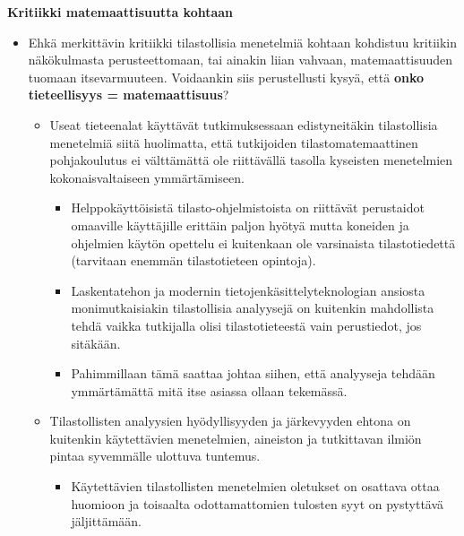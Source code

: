 \documentclass[
]{book}
\providecommand{\tightlist}{%
  \setlength{\itemsep}{0pt}\setlength{\parskip}{0pt}}
\begin{document}
\hfill\break
\hfill\break

\textbf{Kritiikki matemaattisuutta kohtaan}

\begin{itemize}
\tightlist
\item
  Ehkä merkittävin kritiikki tilastollisia menetelmiä kohtaan kohdistuu kritiikin näkökulmasta perusteettomaan, tai ainakin liian vahvaan, matemaattisuuden tuomaan itsevarmuuteen. Voidaankin siis perustellusti kysyä, että \textbf{onko tieteellisyys = matemaattisuus}?

  \begin{itemize}
  \tightlist
  \item
    Useat tieteenalat käyttävät tutkimuksessaan edistyneitäkin tilastollisia menetelmiä siitä huolimatta, että tutkijoiden tilastomatemaattinen pohjakoulutus ei välttämättä ole riittävällä tasolla kyseisten menetelmien kokonaisvaltaiseen ymmärtämiseen.

    \begin{itemize}
    \tightlist
    \item
      Helppokäyttöisistä tilasto-ohjelmistoista on riittävät perustaidot omaaville käyttäjille erittäin paljon hyötyä mutta koneiden ja ohjelmien käytön opettelu ei kuitenkaan ole varsinaista tilastotiedettä (tarvitaan enemmän tilastotieteen opintoja).
    \item
      Laskentatehon ja modernin tietojenkäsittelyteknologian ansiosta monimutkaisiakin tilastollisia analyysejä on kuitenkin mahdollista tehdä vaikka tutkijalla olisi tilastotieteestä vain perustiedot, jos sitäkään.
    \item
      Pahimmillaan tämä saattaa johtaa siihen, että analyyseja tehdään ymmärtämättä mitä itse asiassa ollaan tekemässä.
    \end{itemize}
  \item
    Tilastollisten analyysien hyödyllisyyden ja järkevyyden ehtona on kuitenkin käytettävien menetelmien, aineiston ja tutkittavan ilmiön pintaa syvemmälle ulottuva tuntemus.

    \begin{itemize}
    \tightlist
    \item
      Käytettävien tilastollisten menetelmien oletukset on osattava ottaa huomioon ja toisaalta odottamattomien tulosten syyt on pystyttävä jäljittämään.


\end{itemize}
\end{itemize}
\end{itemize}
\end{document}
